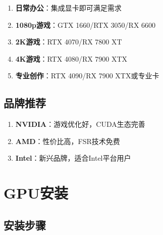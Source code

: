 \documentclass[12pt,UTF8]{ctexbook}
\begin{document}
\begin{enumerate}
    \item \textbf{日常办公}：集成显卡即可满足需求
    \item \textbf{1080p游戏}：GTX 1660/RTX 3050/RX 6600
    \item \textbf{2K游戏}：RTX 4070/RX 7800 XT
    \item \textbf{4K游戏}：RTX 4080/RX 7900 XTX
    \item \textbf{专业创作}：RTX 4090/RX 7900 XTX或专业卡
\end{enumerate}

\section{品牌推荐}

\begin{enumerate}
    \item \textbf{NVIDIA}：游戏优化好，CUDA生态完善
    \item \textbf{AMD}：性价比高，FSR技术免费
    \item \textbf{Intel}：新兴品牌，适合Intel平台用户
\end{enumerate}

\chapter{GPU安装}

\section{安装步骤}
\end{document}
